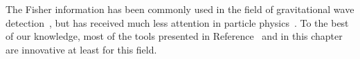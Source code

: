 \newparagraph
%
The Fisher information has been commonly used in the field of
gravitational wave detection~\cite{Jaranowski:1994xd}, but has
received much less attention in particle physics~\cite{CMS:2016kgk,
  Ferreira:2017ymn}. To the best of our knowledge, most of the tools
presented in Reference~\cite{Brehmer:2016nyr} and in this chapter are
innovative at least for this field.





